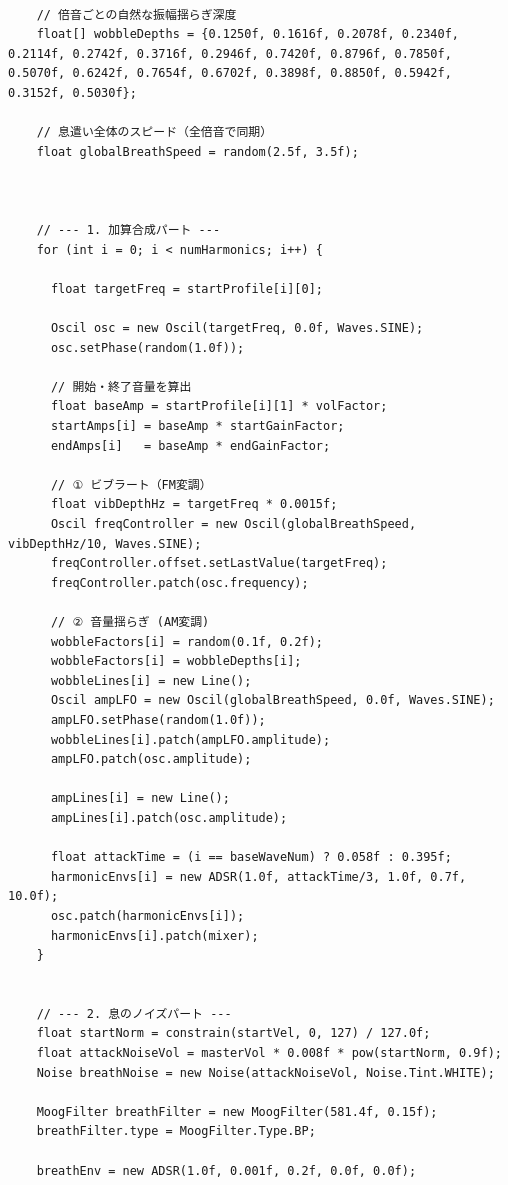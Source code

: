 \begin{lstlisting}[caption={Flute.pde}, label={lst:proc_flute}]
    
    // 倍音ごとの自然な振幅揺らぎ深度
    float[] wobbleDepths = {0.1250f, 0.1616f, 0.2078f, 0.2340f, 0.2114f, 0.2742f, 0.3716f, 0.2946f, 0.7420f, 0.8796f, 0.7850f, 0.5070f, 0.6242f, 0.7654f, 0.6702f, 0.3898f, 0.8850f, 0.5942f, 0.3152f, 0.5030f};
    
    // 息遣い全体のスピード（全倍音で同期）
    float globalBreathSpeed = random(2.5f, 3.5f);
    
    
    
    // --- 1. 加算合成パート ---
    for (int i = 0; i < numHarmonics; i++) {
      
      float targetFreq = startProfile[i][0];
      
      Oscil osc = new Oscil(targetFreq, 0.0f, Waves.SINE);
      osc.setPhase(random(1.0f));
      
      // 開始・終了音量を算出
      float baseAmp = startProfile[i][1] * volFactor;
      startAmps[i] = baseAmp * startGainFactor;
      endAmps[i]   = baseAmp * endGainFactor;
      
      // ① ビブラート（FM変調）
      float vibDepthHz = targetFreq * 0.0015f; 
      Oscil freqController = new Oscil(globalBreathSpeed, vibDepthHz/10, Waves.SINE);
      freqController.offset.setLastValue(targetFreq); 
      freqController.patch(osc.frequency);
      
      // ② 音量揺らぎ (AM変調)
      wobbleFactors[i] = random(0.1f, 0.2f); 
      wobbleFactors[i] = wobbleDepths[i]; 
      wobbleLines[i] = new Line();
      Oscil ampLFO = new Oscil(globalBreathSpeed, 0.0f, Waves.SINE);
      ampLFO.setPhase(random(1.0f));
      wobbleLines[i].patch(ampLFO.amplitude);
      ampLFO.patch(osc.amplitude);
      
      ampLines[i] = new Line();
      ampLines[i].patch(osc.amplitude); 
      
      float attackTime = (i == baseWaveNum) ? 0.058f : 0.395f;
      harmonicEnvs[i] = new ADSR(1.0f, attackTime/3, 1.0f, 0.7f, 10.0f);
      osc.patch(harmonicEnvs[i]);
      harmonicEnvs[i].patch(mixer);
    }
    
    
    // --- 2. 息のノイズパート ---
    float startNorm = constrain(startVel, 0, 127) / 127.0f;
    float attackNoiseVol = masterVol * 0.008f * pow(startNorm, 0.9f); 
    Noise breathNoise = new Noise(attackNoiseVol, Noise.Tint.WHITE);
    
    MoogFilter breathFilter = new MoogFilter(581.4f, 0.15f);
    breathFilter.type = MoogFilter.Type.BP;
    
    breathEnv = new ADSR(1.0f, 0.001f, 0.2f, 0.0f, 0.0f);
    

\end{lstlisting}
